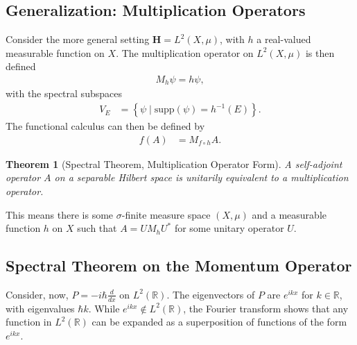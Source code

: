\documentclass[10pt]{extarticle}
\newcommand{\R}{\mathbb{R}}
\newcommand{\set}[1]{\left\{#1\right\}}
\theoremstyle{plain}
\newtheorem*{theorem}{Theorem}%
\theoremstyle{definition}
\theoremstyle{remark}
\renewcommand{\newline}{\hfill\break}
\begin{document}
  \subsection{Generalization: Multiplication Operators}%
  Consider the more general setting $\mathbf{H} = L^{2}(X,\mu)$, with $h$ a real-valued measurable function on $X$. The multiplication operator on $L^{2}(X,\mu)$ is then defined
  \begin{align*}
    M_h\psi = h\psi,
  \end{align*}
  with the spectral subspaces
  \begin{align*}
    V_E &= \set{\psi\mid \text{supp}(\psi) = h^{-1}(E)}.
  \end{align*}
  The functional calculus can then be defined by
  \begin{align*}
    f(A) &= M_{f\circ h}A.
  \end{align*}
  \begin{theorem}[Spectral Theorem, Multiplication Operator Form]
    A self-adjoint operator $A$ on a separable Hilbert space is unitarily equivalent to a multiplication operator.
  \end{theorem}
  This means there is some $\sigma$-finite measure space $(X,\mu)$ and a measurable function $h$ on $X$ such that $A = UM_hU^{\ast}$ for some unitary operator $U$.
  \subsection{Spectral Theorem on the Momentum Operator}%
  Consider, now, $P = -i\hbar \frac{d }{dx}$ on $L^{2}(\R)$. The eigenvectors of $P$ are $e^{ikx}$ for $k\in \R$, with eigenvalues $\hbar k$. While $e^{ikx}\notin L^{2}(\R)$, the Fourier transform shows that any function in $L^{2}(\R)$ can be expanded as a superposition of functions of the form $e^{ikx}$.\newline
\end{document}
